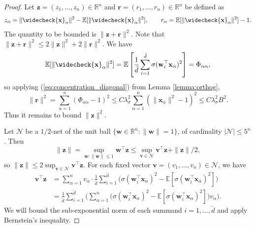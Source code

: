 \documentclass{article}
\theoremstyle{definition}
\newcommand{\R}{\mathbb{R}}
\newcommand{\N}{\mathcal{N}}
\newcommand{\E}{\mathbb{E}}
\newcommand{\x}{\mathbf{x}}
\newcommand{\z}{\mathbf{z}}
\renewcommand{\v}{\mathbf{v}}
\newcommand{\w}{\mathbf{w}}
\renewcommand{\r}{\mathbf{r}}
\renewcommand{\a}{\alpha}
\newcommand{\vd}{\check{d}}
\newcommand{\vx}{\widecheck{\mathbf{x}}}
\newcommand{\1}{\mathbf{1}}
\begin{document}
\begin{proof}
Let $\z=(z_1,\ldots,z_n) \in \R^n$ and $\r=(r_1,\ldots,r_n) \in \R^n$ be defined
as
\[z_\a=\|\vx_\a\|^2-\E[\|\vx_\a\|^2],
\qquad r_\a=\E[\|\vx_\a\|^2]-1.\]
The quantity to be bounded is $\|\z+\r\|^2$. Note that
$\|\z+\r\|^2 \leq 2\|\z\|^2+2\|\r\|^2$. We have
\[\E[\|\vx_\a\|^2]=\E\left[\frac{1}{\vd} \sum_{i=1}^{\vd}
\sigma(\w_i^\top \x_\a)^2 \right]=\Phi_{\a\a},\]
so applying (\ref{eq:concentration_diagonal}) from Lemma \ref{lemma:orthog},
\begin{equation}\label{eq:rsqbound}
\|\r\|^2=\sum_{\a=1}^n (\Phi_{\a\a}-1)^2
\leq C\lambda_\sigma^2 \sum_{\a=1}^n (\|\x_\a\|^2-1)^2 \leq C\lambda_\sigma^2
B^2.
\end{equation}
Thus it remains to bound $\|\z\|^2$.

Let $\N$ be a $1/2$-net of the unit ball $\{\w \in \R^n:\|\w\|=1\}$,
of cardinality $|\N| \leq 5^n$. Then
\[\|\z\|=\sup_{\w:\|\w\| \leq 1}
\w^\top \z \leq \sup_{\v \in \N} \v^\top \z+\|\z\|/2,\]
so $\|\z\| \leq 2\sup_{\v \in \N} \v^\top \z$.
For each fixed vector $\v=(v_1,\ldots,v_n) \in \N$, we have
\begin{align}
\v^\top \z&=\sum_{\a=1}^n v_\a \cdot \frac{1}{\vd}
\sum_{i=1}^{\vd} \Big(\sigma(\w_i^\top \x_\a)^2-\E[\sigma(\w_i^\top \x_\a)^2]
\Big)\nonumber\\
&=\frac{1}{\vd}\sum_{i=1}^{\vd}
\bigg(\sum_{\a=1}^n
\Big(\sigma(\w_i^\top \x_\a)^2-\E[\sigma(\w_i^\top \x_\a)^2]\Big) v_\a\bigg).
\label{eq:vzprod}
\end{align}
We will bound the sub-exponential norm of each summand $i=1,\ldots,\vd$ and
apply Bernstein's inequality.


\end{proof}
\end{document}
